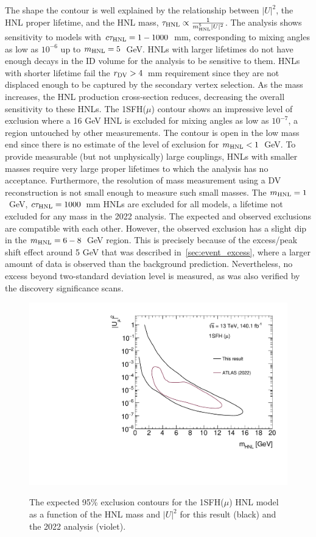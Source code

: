 The shape the contour is well explained by the relationship between $|U|^2$, the HNL proper lifetime, and the HNL mass, $\tau_\mathrm{HNL} \propto \frac{1}{m_{\mathrm{HNL}}^5 |U|^2}$. The analysis shows sensitivity to models with $c\tau_\mathrm{HNL}=1-1000$~mm, corresponding to mixing angles as low as $10^{-6}$ up to $m_{\mathrm{HNL}}=5$~GeV. HNLs with larger lifetimes do not have enough decays in the ID volume for the analysis to be sensitive to them. HNLs with shorter lifetime fail the $r_{\mathrm{DV}}>4$~mm requirement since they are not displaced enough to be captured by the secondary vertex selection. As the mass increases, the HNL production cross-section reduces, decreasing the overall sensitivity to these HNLs. The 1SFH($\mu$) contour shows an impressive level of exclusion where a 16 GeV HNL is excluded for mixing angles as low as $10^{-7}$, a region untouched by other measurements. The contour is open in the low mass end since there is no estimate of the level of exclusion for $m_{\mathrm{HNL}}<1$~GeV. To provide measurable (but not unphysically) large couplings, HNLs with smaller masses require very large proper lifetimes to which the analysis has no acceptance. Furthermore, the resolution of mass measurement using a DV reconstruction is not small enough to measure such small masses. The $m_{\mathrm{HNL}}=1$~GeV, $c\tau_\mathrm{HNL}=1000$~mm HNLs are excluded for all models, a lifetime not excluded for any mass in the 2022 analysis. The expected and observed exclusions are compatible with each other. However, the observed exclusion has a slight dip in the $m_{\mathrm{HNL}}=6-8$~GeV region. This is precisely because of the excess/peak shift effect around 5 GeV that was described in~\cref{sec:event_excess}, where a larger amount of data is observed than the background prediction. Nevertheless, no excess beyond two-standard deviation level is measured, as was also verified by the discovery significance scans.

\begin{figure}[!htbp]
    \centering
    \includegraphics[width=.72\textwidth]{figures/results/limits_M_LNCpLNV_SF_mu_v_r21.pdf}\\
    \caption{The expected 95\% exclusion contours for the 1SFH($\mu$) HNL model as a function of the HNL mass and $|U|^2$ for this result (black) and the 2022 analysis (violet).}
    \label{fig:mu_only_limit_vs_2022}
\end{figure}

